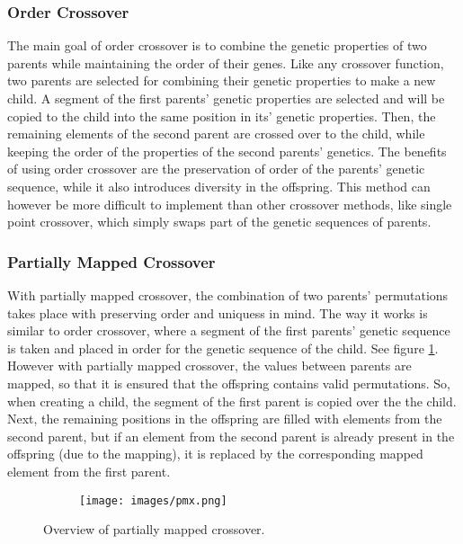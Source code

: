 \documentclass{article}
\begin{document}
\bigskip
\subsubsection{Order Crossover}
The main goal of order crossover is to combine the genetic properties of two parents while maintaining the order of their genes. Like any crossover function, two parents are selected for combining their genetic properties to make a new child. A segment of the first parents' genetic properties are selected and will be copied to the child into the same position in its' genetic properties. Then, the remaining elements of the second parent are crossed over to the child, while keeping the order of the properties of the second parents' genetics.
\smallbreak
The benefits of using order crossover are the preservation of order of the parents' genetic sequence, while it also introduces diversity in the offspring. This method can however be more difficult to implement than other crossover methods, like single point crossover, which simply swaps part of the genetic sequences of parents.

\bigskip 
\subsubsection{Partially Mapped Crossover}
With partially mapped crossover, the combination of two parents' permutations takes place with preserving order and uniquess in mind. The way it works is similar to order crossover, where a segment of the first parents' genetic sequence is taken and placed in order for the genetic sequence of the child. See figure \ref{fig:pmx}.
\smallskip
However with partially mapped crossover, the values between parents are mapped, so that it is ensured that the offspring contains valid permutations. So, when creating a child, the segment of the first parent is copied over the the child. Next, the remaining positions in the offspring are filled with elements from the second parent, but if an element from the second parent is already present in the offspring (due to the mapping), it is replaced by the corresponding mapped element from the first parent.

\begin{figure}
  \centering
  \begin{subfigure}[H]{0.6\linewidth}
    \texttt{[image: images/pmx.png]}
  \end{subfigure}
  \caption{Overview of partially mapped crossover.}
  \label{fig:pmx}
\end{figure}
\end{document}
